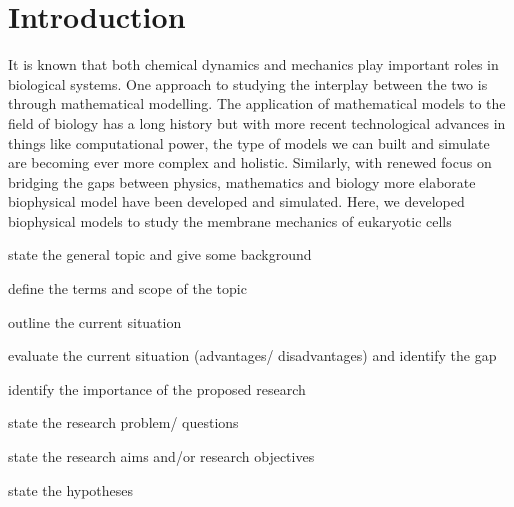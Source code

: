 \chapter{Introduction}

It is known that both chemical dynamics and mechanics play important roles in biological systems. One approach to studying the interplay between the two is through mathematical modelling. The application of mathematical models to the field of biology has a long history but with more recent technological advances in things like computational power, the type of models we can built and simulate are becoming ever more complex and holistic.  Similarly, with renewed focus on bridging the gaps between physics, mathematics and biology more elaborate biophysical model have been developed and simulated. Here, we developed biophysical models to study the membrane mechanics of eukaryotic cells







    state the general topic and give some background
    
    define the terms and scope of the topic
    
    outline the current situation
    
    evaluate the current situation (advantages/ disadvantages) and identify the gap
    
    identify the importance of the proposed research
    
    state the research problem/ questions
    
    state the research aims and/or research objectives
    
    state the hypotheses
